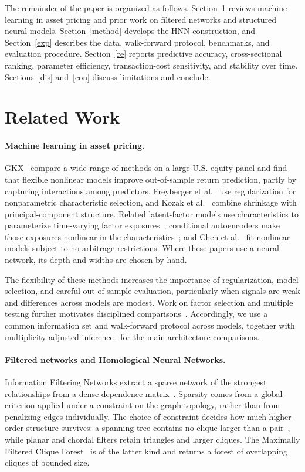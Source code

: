 \documentclass[sigconf,nonacm]{acmart}
\begin{document}
The remainder of the paper is organized as follows. Section~\ref{rela} reviews
machine learning in asset pricing and prior work on filtered networks and
structured neural models. Section~\ref{method} develops the HNN construction,
and Section~\ref{exp} describes the data, walk-forward protocol, benchmarks, and
evaluation procedure. Section~\ref{re} reports predictive accuracy,
cross-sectional ranking, parameter efficiency, transaction-cost sensitivity, and
stability over time. Sections~\ref{dis} and~\ref{con} discuss limitations and
conclude.


\section{Related Work}\label{rela}

\paragraph{Machine learning in asset pricing.}
GKX~\cite{gu2020} compare a wide range of methods on a large U.S. equity panel
and find that flexible nonlinear models improve out-of-sample return prediction,
partly by capturing interactions among predictors. Freyberger et
al.~\cite{freyberger2020} use regularization for nonparametric characteristic
selection, and Kozak et al.~\cite{kozak2020} combine shrinkage with
principal-component structure. Related latent-factor models use characteristics
to parameterize time-varying factor exposures~\cite{kelly2019}; conditional
autoencoders make those exposures nonlinear in the
characteristics~\cite{gu2021autoencoder}; and Chen et al.~\cite{chen2024} fit
nonlinear models subject to no-arbitrage restrictions. Where these papers use a
neural network, its depth and widths are chosen by hand.

The flexibility of these methods increases the importance of regularization,
model selection, and careful out-of-sample evaluation, particularly when  signals are weak and differences across models are modest.
Work on factor selection and multiple testing further motivates disciplined
comparisons~\cite{feng2020,harvey2016}. Accordingly, we use a common information
set and walk-forward protocol across models, together with multiplicity-adjusted
inference~\cite{holm1979} for the main architecture comparisons.

\paragraph{Filtered networks and Homological Neural Networks.}
Information Filtering Networks extract a sparse network of the strongest
relationships from a dense dependence
matrix~\cite{tumminello2005,massara2017}. Sparsity comes from a global criterion
applied under a constraint on the graph topology, rather than from penalizing
edges individually. The choice of constraint decides how much higher-order
structure survives: a spanning tree contains no clique larger than a
pair~\cite{mantegna1999}, while planar and chordal filters retain triangles and
larger cliques. The Maximally Filtered Clique Forest~\cite{massara2019} is of the latter kind and returns a forest of overlapping cliques of bounded size.
\end{document}
